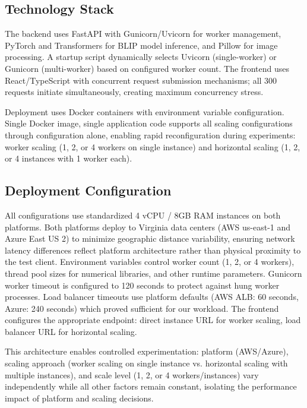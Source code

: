 \subsection{Technology Stack}

The backend uses FastAPI with Gunicorn/Uvicorn for worker management, PyTorch and Transformers for BLIP model inference, and Pillow for image processing. A startup script dynamically selects Uvicorn (single-worker) or Gunicorn (multi-worker) based on configured worker count. The frontend uses React/TypeScript with concurrent request submission mechanisms; all 300 requests initiate simultaneously, creating maximum concurrency stress.

Deployment uses Docker containers with environment variable configuration. Single Docker image, single application code supports all scaling configurations through configuration alone, enabling rapid reconfiguration during experiments: worker scaling (1, 2, or 4 workers on single instance) and horizontal scaling (1, 2, or 4 instances with 1 worker each).

\subsection{Deployment Configuration}

All configurations use standardized 4 vCPU / 8GB RAM instances on both platforms. Both platforms deploy to Virginia data centers (AWS us-east-1 and Azure East US 2) to minimize geographic distance variability, ensuring network latency differences reflect platform architecture rather than physical proximity to the test client. Environment variables control worker count (1, 2, or 4 workers), thread pool sizes for numerical libraries, and other runtime parameters. Gunicorn worker timeout is configured to 120 seconds to protect against hung worker processes. Load balancer timeouts use platform defaults (AWS ALB: 60 seconds, Azure: 240 seconds) which proved sufficient for our workload. The frontend configures the appropriate endpoint: direct instance URL for worker scaling, load balancer URL for horizontal scaling.

This architecture enables controlled experimentation: platform (AWS/Azure), scaling approach (worker scaling on single instance vs. horizontal scaling with multiple instances), and scale level (1, 2, or 4 workers/instances) vary independently while all other factors remain constant, isolating the performance impact of platform and scaling decisions.
